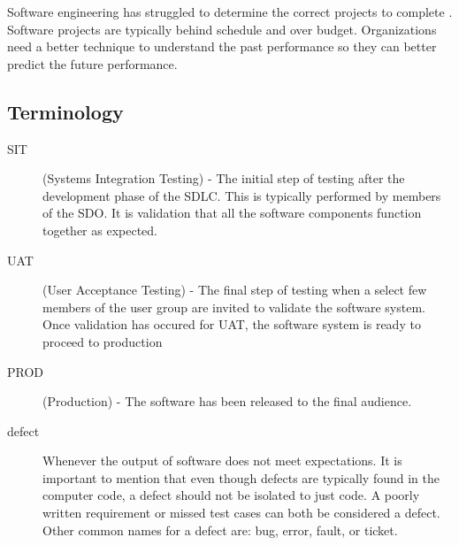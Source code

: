 \documentclass[SDSUThesis.tex]{subfiles}
\begin{document}
    
    Software engineering has struggled to determine the correct projects to complete \cite{DeMarco2009}.
    Software projects are typically behind schedule and over budget. Organizations need a better
    technique to understand the past performance so they can better predict the future performance.

\subsection{Terminology}

\begin{description}
    \item[SIT]   (Systems Integration Testing) - The initial step of testing
        after the development phase of the SDLC.  This is typically 
        performed by members of the SDO.  It is validation that all the
        software components function together as expected.
    \item[UAT]   (User Acceptance Testing) - The final step of testing
        when a select few members of the user group are invited to
        validate the software system. Once validation has occured for
        UAT, the software system is ready to proceed to production
    \item[PROD]  (Production) - The software has been released to the final audience.
    \item[defect] Whenever the output of software does not meet expectations.  It is important to mention that even though defects are typically 
            found in the computer code, a defect should not be isolated to just code.   A poorly written requirement or missed test cases can 
            both be considered a defect.  Other common names for a defect are: bug, error, fault, or ticket.
\end{description}


\end{document}
